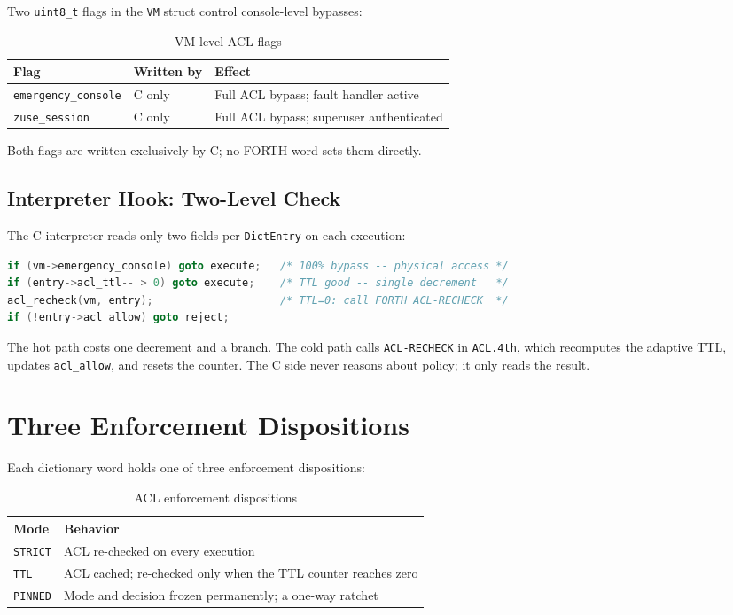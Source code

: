 Two \texttt{uint8\_t} flags in the \texttt{VM} struct control console-level
bypasses:

\begin{table}[ht]
  \centering
  \caption{VM-level ACL flags}
  \label{tab:vm-acl-flags}
  \begin{tabular}{lll}
    \toprule
    Flag & Written by & Effect \\
    \midrule
    \texttt{emergency\_console} & C only & Full ACL bypass; fault handler active \\
    \texttt{zuse\_session}      & C only & Full ACL bypass; superuser authenticated \\
    \bottomrule
  \end{tabular}
\end{table}

Both flags are written exclusively by C; no FORTH word sets them directly.

\subsection{Interpreter Hook: Two-Level Check}

The C interpreter reads only two fields per \texttt{DictEntry} on each
execution:

\begin{lstlisting}[language=C]
if (vm->emergency_console) goto execute;   /* 100% bypass -- physical access */
if (entry->acl_ttl-- > 0) goto execute;    /* TTL good -- single decrement   */
acl_recheck(vm, entry);                    /* TTL=0: call FORTH ACL-RECHECK  */
if (!entry->acl_allow) goto reject;
\end{lstlisting}

The hot path costs one decrement and a branch. The cold path calls
\texttt{ACL-RECHECK} in \texttt{ACL.4th}, which recomputes the adaptive
TTL, updates \texttt{acl\_allow}, and resets the counter. The C side never
reasons about policy; it only reads the result.

\section{Three Enforcement Dispositions}
\label{vol2:sec:acl:dispositions}


Each dictionary word holds one of three enforcement dispositions:

\begin{table}[ht]
  \centering
  \caption{ACL enforcement dispositions}
  \label{tab:acl-dispositions}
  \begin{tabular}{ll}
    \toprule
    Mode & Behavior \\
    \midrule
    \texttt{STRICT} & ACL re-checked on every execution \\
    \texttt{TTL}    & ACL cached; re-checked only when the TTL counter reaches zero \\
    \texttt{PINNED} & Mode and decision frozen permanently; a one-way ratchet \\
    \bottomrule
  \end{tabular}
\end{table}

